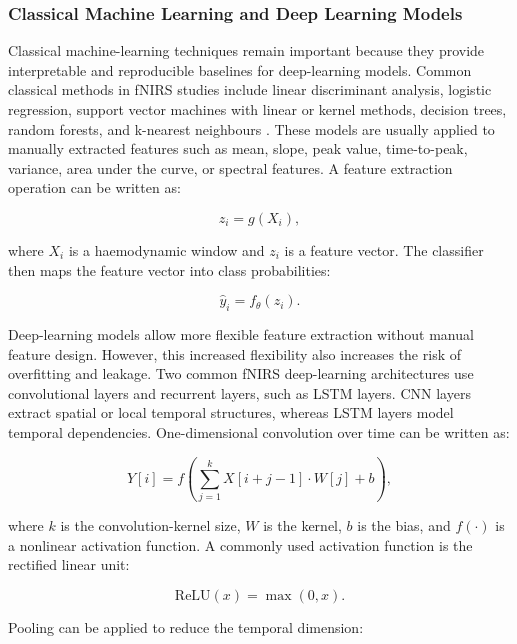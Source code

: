\subsubsection{Classical Machine Learning and Deep Learning Models}

Classical machine-learning techniques remain important because they provide interpretable and
reproducible baselines for deep-learning models. Common classical methods in fNIRS studies include
linear discriminant analysis, logistic regression, support vector machines with linear or kernel
methods, decision trees, random forests, and k-nearest neighbours \cite{Benerradi2023,Eastmond2022}.
These models are usually applied to manually extracted features such as mean, slope, peak value,
time-to-peak, variance, area under the curve, or spectral features. A feature extraction operation
can be written as:

\begin{equation}
z_i=g(X_i),
\end{equation}

where \(X_i\) is a haemodynamic window and \(z_i\) is a feature vector. The classifier then maps the
feature vector into class probabilities:

\begin{equation}
\hat{y}_i=f_{\theta}(z_i).
\end{equation}

Deep-learning models allow more flexible feature extraction without manual feature design. However,
this increased flexibility also increases the risk of overfitting and leakage. Two common fNIRS
deep-learning architectures use convolutional layers and recurrent layers, such as LSTM layers. CNN
layers extract spatial or local temporal structures, whereas LSTM layers model temporal
dependencies. One-dimensional convolution over time can be written as:

\begin{equation}
Y[i]=f\left(\sum_{j=1}^{k}X[i+j-1]\cdot W[j]+b\right),
\end{equation}

where \(k\) is the convolution-kernel size, \(W\) is the kernel, \(b\) is the bias, and \(f(\cdot)\)
is a nonlinear activation function. A commonly used activation function is the rectified linear
unit:

\begin{equation}
\mathrm{ReLU}(x)=\max(0,x).
\end{equation}

Pooling can be applied to reduce the temporal dimension:


